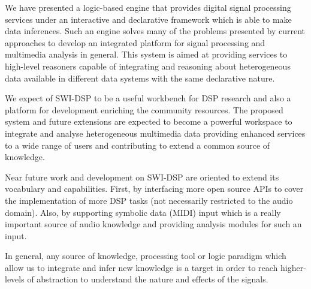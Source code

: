 \documentclass[runningheads]{llncs}
\begin{document}
We have presented a logic-based engine that provides digital signal processing services under an interactive and declarative framework which is able to make data inferences. Such an engine solves many of the problems presented by current approaches to develop an integrated platform for signal processing and multimedia analysis in general. This system is aimed at providing services to high-level reasoners capable of integrating and reasoning about heterogeneous data available in different data systems with the same declarative nature.

We expect of SWI-DSP to be a useful workbench for DSP research and also a platform for development enriching the community resources. The proposed system and future extensions are expected to become a powerful workspace to integrate and analyse heterogeneous multimedia data providing enhanced services to a wide range of users and contributing to extend a common source of knowledge.

Near future work and development on SWI-DSP are oriented to extend its vocabulary and capabilities. First, by interfacing more open source APIs to cover the implementation of more DSP tasks (not necessarily restricted to the audio domain). Also, by supporting symbolic data (MIDI) input which is a really important source of audio knowledge and providing analysis modules for such an input.

In general, any source of knowledge, processing tool or logic paradigm which allow us to integrate and infer new knowledge is a target in order to reach higher-levels of abstraction to understand the nature and effects of the signals.
\end{document}
